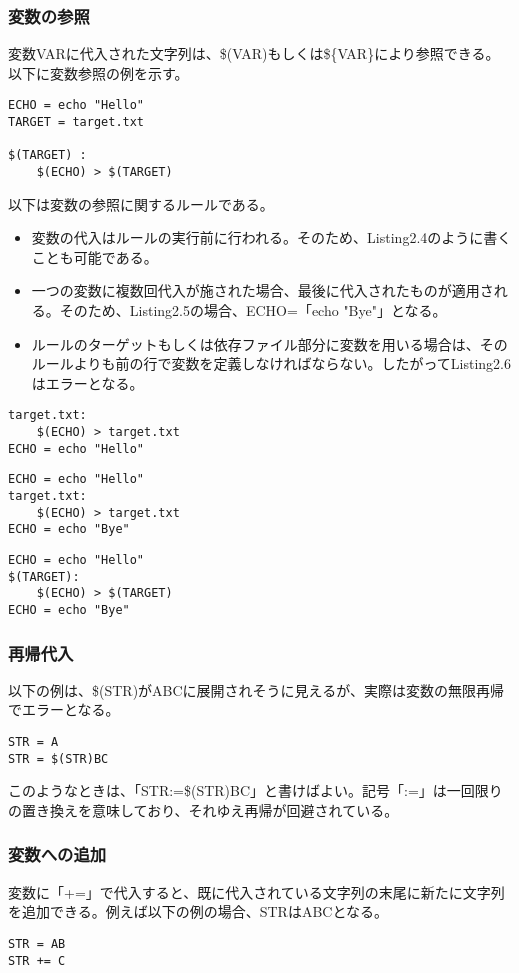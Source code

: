 \documentclass[dvipdfmx, 9pt, a4paper]{jsarticle}
\numberwithin{equation}{section}
\begin{document}
\subsubsection{変数の参照}
変数VARに代入された文字列は、\$(VAR)もしくは\$\{VAR\}により参照できる。以下に変数参照の例を示す。
\begin{lstlisting}[caption=変数の参照]
ECHO = echo "Hello"
TARGET = target.txt

$(TARGET) :
	$(ECHO) > $(TARGET)
\end{lstlisting}\par
以下は変数の参照に関するルールである。
\begin{itemize}
\item 変数の代入はルールの実行前に行われる。そのため、Listing2.4のように書くことも可能である。
\item 一つの変数に複数回代入が施された場合、最後に代入されたものが適用される。そのため、Listing2.5の場合、ECHO=「echo "Bye"」となる。
\item ルールのターゲットもしくは依存ファイル部分に変数を用いる場合は、そのルールよりも前の行で変数を定義しなければならない。したがってListing2.6はエラーとなる。
\end{itemize}
\begin{lstlisting}[caption=変数の参照例1]
target.txt:
	$(ECHO) > target.txt
ECHO = echo "Hello"
\end{lstlisting}
\begin{lstlisting}[caption=変数の参照例2]
ECHO = echo "Hello"
target.txt:
	$(ECHO) > target.txt
ECHO = echo "Bye"
\end{lstlisting}
\begin{lstlisting}[caption=変数の参照例3(エラー例)]
ECHO = echo "Hello"
$(TARGET):
	$(ECHO) > $(TARGET)
ECHO = echo "Bye"
\end{lstlisting}

\subsubsection{再帰代入}
以下の例は、\$(STR)がABCに展開されそうに見えるが、実際は変数の無限再帰でエラーとなる。
\begin{lstlisting}[caption=無限再帰の例]
STR = A
STR = $(STR)BC
\end{lstlisting}\par
このようなときは、「STR:=\$(STR)BC」と書けばよい。記号「:=」は一回限りの置き換えを意味しており、それゆえ再帰が回避されている。
\subsubsection{変数への追加}
変数に「+=」で代入すると、既に代入されている文字列の末尾に新たに文字列を追加できる。例えば以下の例の場合、STRはABCとなる。
\begin{lstlisting}[caption=文字列追加の例]
STR = AB
STR += C
\end{lstlisting}
\end{document}
